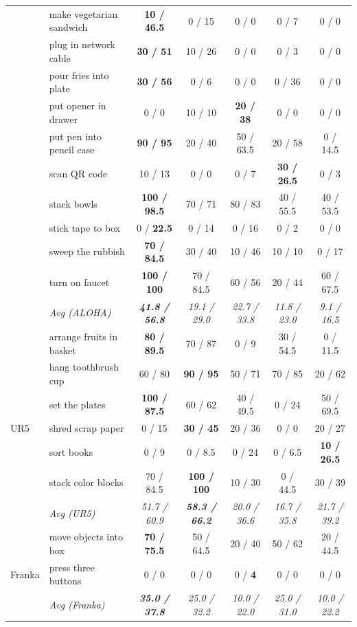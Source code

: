 \begin{table}[!t]
{\begin{tabular}{llccccc}
& make vegetarian sandwich & \textbf{10 / 46.5} & 0 / 15 & 0 / 0 & 0 / 7 & 0 / 0 \\
& plug in network cable & \textbf{30 / 51} & 10 / 26 & 0 / 0 & 0 / 3 & 0 / 0 \\
& pour fries into plate & \textbf{30 / 56} & 0 / 6 & 0 / 0 & 0 / 36 & 0 / 0 \\
& put opener in drawer & 0 / 0 & 10 / 10 & \textbf{20 / 38} & 0 / 0 & 0 / 0 \\
& put pen into pencil case & \textbf{90 / 95} & 20 / 40 & 50 / 63.5 & 20 / 58 & 0 / 14.5 \\
& scan QR code & 10 / 13 & 0 / 0 & 0 / 7 & \textbf{30 / 26.5} & 0 / 3 \\
& stack bowls & \textbf{100 / 98.5} & 70 / 71 & 80 / 83 & 40 / 55.5 & 40 / 53.5 \\
& stick tape to box & 0 / \textbf{22.5} & 0 / 14 & 0 / 16 & 0 / 2 & 0 / 0 \\
& sweep the rubbish & \textbf{70 / 84.5} & 30 / 40 & 10 / 46 & 10 / 10 & 0 / 17 \\
& turn on faucet & \textbf{100 / 100} & 70 / 84.5 & 60 / 56 & 20 / 44 & 60 / 67.5 \\
\addlinespace[2pt]\cmidrule{2-7}\addlinespace[2pt]
& \textit{Avg (ALOHA)} & \textbf{\textit{41.8 / 56.8}} & \textit{19.1 / 29.0} & \textit{22.7 / 33.8} & \textit{11.8 / 23.0} & \textit{9.1 / 16.5} \\
\midrule
\multirow{7}{*}{UR5}
& arrange fruits in basket & \textbf{80 / 89.5} & 70 / 87 & 0 / 9 & 30 / 54.5 & 0 / 11.5 \\
& hang toothbrush cup & 60 / 80 & \textbf{90 / 95} & 50 / 71 & 70 / 85 & 20 / 62 \\
& set the plates & \textbf{100 / 87.5} & 60 / 62 & 40 / 49.5 & 0 / 24 & 50 / 69.5 \\
& shred scrap paper & 0 / 15 & \textbf{30 / 45} & 20 / 36 & 0 / 0 & 20 / 27 \\
& sort books & 0 / 9 & 0 / 8.5 & 0 / 24 & 0 / 6.5 & \textbf{10 / 26.5} \\
& stack color blocks & 70 / 84.5 & \textbf{100 / 100} & 10 / 30 & 0 / 44.5 & 30 / 39 \\
\addlinespace[2pt]\cmidrule{2-7}\addlinespace[2pt]
& \textit{Avg (UR5)} & \textit{51.7 / 60.9} & \textbf{\textit{58.3 / 66.2}} & \textit{20.0 / 36.6} & \textit{16.7 / 35.8} & \textit{21.7 / 39.2} \\
\midrule
\multirow{3}{*}{Franka}
& move objects into box & \textbf{70 / 75.5} & 50 / 64.5 & 20 / 40 & 50 / 62 & 20 / 44.5 \\
& press three buttons & 0 / 0 & 0 / 0 & 0 / \textbf{4} & 0 / 0 & 0 / 0 \\
\addlinespace[2pt]\cmidrule{2-7}\addlinespace[2pt]
& \textit{Avg (Franka)} & \textbf{\textit{35.0 / 37.8}} & \textit{25.0 / 32.2} & \textit{10.0 / 22.0} & \textit{25.0 / 31.0} & \textit{10.0 / 22.2} \\
\bottomrule
\end{tabular}
}
\end{table}



